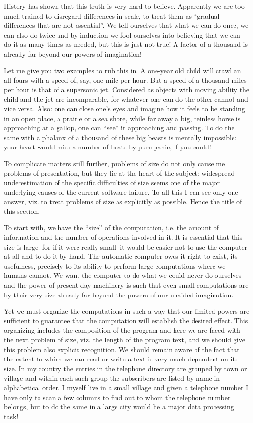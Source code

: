 \documentclass[twoside,11pt]{book}
\begin{document}
History has shown that this truth is very hard to believe. Apparently we are too much trained to disregard differences in scale, to treat them as ``gradual differences that are not essential''. We tell ourselves that what we can do once, we can also do twice and by induction we fool ourselves into believing that we can do it as many times as needed, but this is just not true! A factor of a thousand is already far beyond our powers of imagination!

Let me give you two examples to rub this in. A one-year old child will crawl an all fours with a speed of, say, one mile per hour. But a speed of a thousand miles per hour is that of a supersonic jet. Considered as objects with moving ability the child and the jet are incomparable, for whatever one can do the other cannot and vice versa. Also: one can close one's eyes and imagine how it feels to be standing in an open place, a prairie or a sea shore, while far away a big, reinless horse is approaching at a gallop, one can ``see'' it approaching and passing. To do the same with a phalanx of a thousand of these big beasts is mentally impossible: your heart would miss a number of beats by pure panic, if you could!

To complicate matters still further, problems of size do not only cause me problems of presentation, but they lie at the heart of the subject: widespread underestimation of the specific difficulties of size seems one of the major underlying causes of the current software failure. To all this I can see only one answer, viz. to treat problems of size as explicitly as possible. Hence the title of this section.

To start with, we have the ``size'' of the computation, i.e. the amount of information and the number of operations involved in it. It is essential that this size is large, for if it were really small, it would be easier not to use the computer at all and to do it by hand. The automatic computer owes it right to exist, its usefulness, precisely to its ability to perform large computations where we humans cannot. We want the computer to do what we could never do ourselves and the power of present-day machinery is such that even small computations are by their very size already far beyond the powers of our unaided imagination.

Yet we must organize the computations in such a way that our limited powers are sufficient to guarantee that the computation will establish the desired effect. This organizing includes the composition of the program and here we are faced with the next problem of size, viz. the length of the program text, and we should give this problem also explicit recognition. We should remain aware of the fact that the extent to which we can read or write a text is very much dependent on its size. In my country the entries in the telephone directory are grouped by town or village and within each such group the subscribers are listed by name in alphabetical order. I myself live in a small village and given a telephone number I have only to scan a few columns to find out to whom the telephone number belongs, but to do the same in a large city would be a major data processing task!
\end{document}
